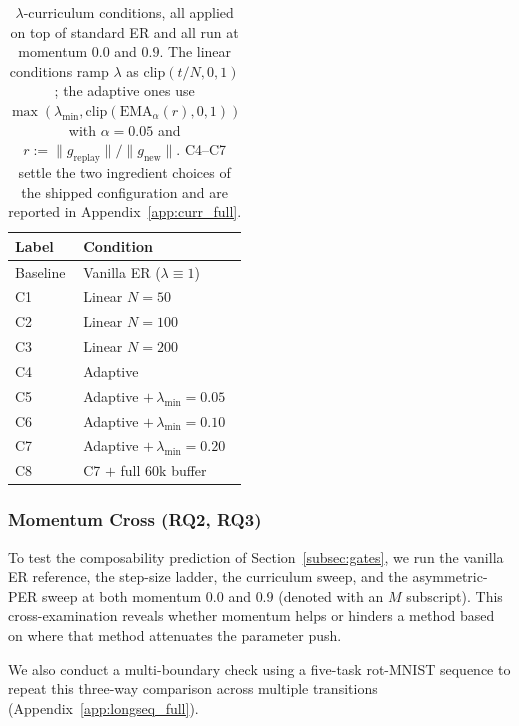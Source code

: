 \begin{table}[htbp]
    \centering
    \small
    \begin{tabular}{@{}l l@{}}
        \hline
        Label    & Condition                           \\
        \hline
        Baseline & Vanilla ER ($\lambda \equiv 1$)     \\
        C1       & Linear $N{=}50$                     \\
        C2       & Linear $N{=}100$                    \\
        C3       & Linear $N{=}200$                    \\
        C4       & Adaptive                            \\
        C5       & Adaptive $+\,\lambda_{\min}{=}0.05$ \\
        C6       & Adaptive $+\,\lambda_{\min}{=}0.10$ \\
        C7       & Adaptive $+\,\lambda_{\min}{=}0.20$ \\
        C8       & C7 $+$ full $60$k buffer            \\
        \hline
    \end{tabular}
    \caption{$\lambda$-curriculum conditions, all applied on top of standard ER and all run at momentum $0.0$ and $0.9$. The linear conditions ramp $\lambda$ as $\mathrm{clip}(t/N, 0, 1)$; the adaptive ones use $\max(\lambda_{\min}, \mathrm{clip}(\mathrm{EMA}_\alpha(r), 0, 1))$ with $\alpha = 0.05$ and $r := \|g_{\text{replay}}\|/\|g_{\text{new}}\|$. C4--C7 settle the two ingredient choices of the shipped configuration and are reported in Appendix~\ref{app:curr_full}.}
    \label{tab:curriculum}
\end{table}


\subsubsection{Momentum Cross (RQ2, RQ3)}
\label{subsec:momentum}

To test the composability prediction of Section~\ref{subsec:gates}, we run the vanilla ER reference, the step-size ladder, the curriculum sweep, and the asymmetric-PER sweep at both momentum $0.0$ and $0.9$ (denoted with an $M$ subscript). This cross-examination reveals whether momentum helps or hinders a method based on where that method attenuates the parameter push.

We also conduct a multi-boundary check using a five-task rot-MNIST sequence to repeat this three-way comparison across multiple transitions (Appendix~\ref{app:longseq_full}).

